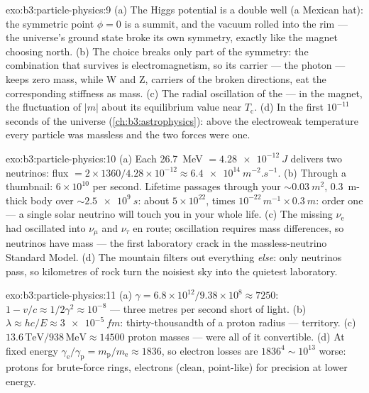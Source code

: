 \begin{solution}{exo:b3:particle-physics:9}
(a) The Higgs potential is a double well (a Mexican hat): the
symmetric point $\phi = 0$ is a summit, and the vacuum rolled
into the rim --- the universe's ground state broke its own
symmetry, exactly like the magnet choosing north. (b) The choice
breaks only part of the symmetry: the combination that survives
is electromagnetism, so its carrier --- the photon --- keeps
zero mass, while W and Z, carriers of the broken directions,
eat the corresponding stiffness as mass. (c) The radial
oscillation of the  --- in the magnet, the
fluctuation of $|m|$ about its equilibrium value near
$T_{\text{c}}$. (d) In the first $10^{-11}$ seconds of the
universe (\cref{ch:b3:astrophysics}): above the electroweak
temperature every particle was massless and the two forces were
one.
\end{solution}

\begin{solution}{exo:b3:particle-physics:10}
(a) Each \qty{26.7}{MeV} $= \qty{4.28e-12}{J}$ delivers two
neutrinos: flux $= 2\times1360/4.28\times10^{-12} \approx
\qty{6.4e14}{m^{-2}.s^{-1}}$. (b) Through a thumbnail:
$6\times10^{10}$ per second. Lifetime passages through your
${\sim}\qty{0.03}{m^2}$, \qty{0.3}{m}-thick body over
${\sim}\qty{2.5e9}{s}$: about $5\times10^{22}$, times
$10^{-22}\,\unit{m^{-1}}\times\qty{0.3}{m}$: order one ---
a single solar neutrino will touch you in your whole life. (c)
The missing $\nu_{\text{e}}$ had oscillated into $\nu_\mu$ and
$\nu_\tau$ en route; oscillation requires mass differences, so
neutrinos have mass --- the first laboratory crack in the
massless-neutrino Standard Model. (d) The mountain filters out
everything \emph{else}: only neutrinos pass, so kilometres of
rock turn the noisiest sky into the quietest laboratory.
\end{solution}

\begin{solution}{exo:b3:particle-physics:11}
(a) $\gamma = 6.8\times10^{12}/9.38\times10^{8} \approx 7250$:
$1 - v/c \approx 1/2\gamma^2 \approx 10^{-8}$ --- three metres
per second short of light. (b) $\lambda \approx hc/E \approx
\qty{3e-5}{fm}$: thirty-thousandth of a proton radius --- 
territory. (c) $13.6\,\text{TeV}/938\,\text{MeV} \approx
14500$ proton masses --- were all of it convertible. (d) At
fixed energy $\gamma_{\text{e}}/\gamma_{\text{p}} =
m_{\text{p}}/m_{\text{e}} \approx 1836$, so electron losses are
$1836^4 \sim 10^{13}$ worse: protons for brute-force rings,
electrons (clean, point-like) for precision at lower energy.
\end{solution}

